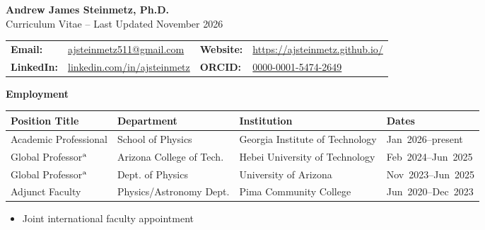 \documentclass[11pt]{article}
\begin{document}

\begin{center}
    {\Large\textbf{Andrew James Steinmetz, Ph.D.}}\\[0.5em]
    {\large Curriculum Vitae -- Last Updated November 2026}
\end{center}

{\normalsize
\begin{center}
    \begin{tabular}{@{}p{2.0cm} p{5.5cm} p{2.0cm} p{5.5cm}@{}}
        \textbf{Email:} & \href{mailto:ajsteinmetz511@gmail.com}{ajsteinmetz511@gmail.com} &
        \textbf{Website:} & \href{https://ajsteinmetz.github.io/}{https://ajsteinmetz.github.io/} \\
        \textbf{LinkedIn:} & \href{https://www.linkedin.com/in/ajsteinmetz/}{linkedin.com/in/ajsteinmetz} &
        \textbf{ORCID:} & \href{https://orcid.org/0000-0001-5474-2649}{0000-0001-5474-2649} \\
    \end{tabular}
\end{center}
}

\medskip


{\Large\textbf{Employment}}

{\normalsize
\begin{tabular}{@{}p{3.8cm} p{4.4cm} p{5.3cm} p{3.0cm}@{}}
    \toprule
    \textbf{Position Title} & \textbf{Department} & \textbf{Institution} & \textbf{Dates} \\
    \midrule
    Academic Professional & School of Physics & Georgia Institute of Technology & {\small Jan~2026--present} \\
    Global Professor\(^{\rm a}\) & Arizona College of Tech. & Hebei University of Technology & {\small Feb~2024--Jun~2025} \\
    Global Professor\(^{\rm a}\) & Dept. of Physics & University of Arizona & {\small Nov~2023--Jun~2025} \\
    Adjunct Faculty & Physics/Astronomy Dept. & Pima Community College & {\small Jun~2020--Dec~2023} \\
    \bottomrule
\end{tabular}
}

\begin{itemize}[leftmargin=*,nosep]
    \item[\(^{\rm a}\)] {\small Joint international faculty appointment}
\end{itemize}
\end{document}
